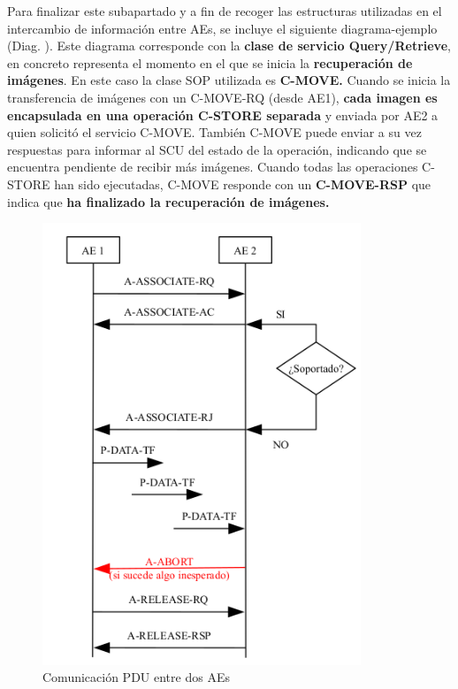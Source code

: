 Para finalizar este subapartado y a fin de recoger las estructuras utilizadas en el intercambio de información entre AEs, se incluye el siguiente diagrama-ejemplo (Diag. ). Este diagrama corresponde con la \textbf{clase de servicio Query/Retrieve}, en concreto representa el momento en el que se inicia la \textbf{recuperación de imágenes}. En este caso la clase SOP utilizada es \textbf{C-MOVE.} Cuando se inicia la transferencia de imágenes con un C-MOVE-RQ (desde AE1), \textbf{cada imagen es encapsulada en una operación C-STORE separada} y enviada por AE2 a quien solicitó el servicio C-MOVE. También C-MOVE puede enviar a su vez respuestas para informar al SCU del estado de la operación, indicando que se encuentra pendiente de recibir más imágenes. Cuando todas las operaciones C-STORE han sido ejecutadas, C-MOVE responde con un \textbf{C-MOVE-RSP} que indica que \textbf{ha finalizado la recuperación de imágenes.}

\begin{figure}[!h]
\begin{center}
\includegraphics[width=0.85\textwidth]{images/comunicacionPDU.png}
\caption{Comunicación PDU entre dos AEs}
\label{fig:comunicacionPDU}
\end{center}
\end{figure}

